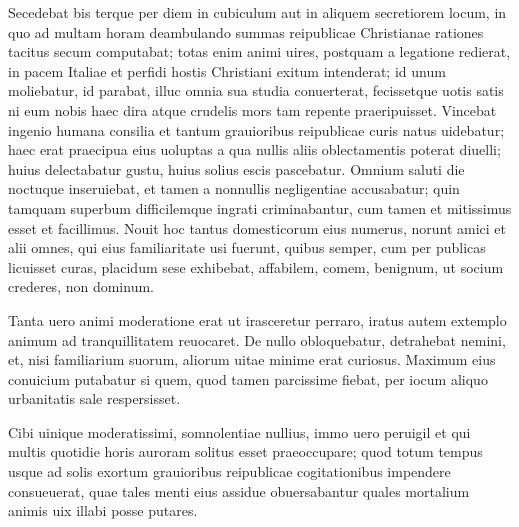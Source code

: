 \documentclass[a5paper,twoside]{article}
\begin{document}
Secedebat bis terque per diem in cubiculum aut in aliquem secretiorem locum, in quo ad multam horam deambulando summas reipublicae Christianae rationes tacitus secum computabat; totas enim animi uires, postquam a legatione redierat, in pacem Italiae et perfidi hostis Christiani exitum %
intenderat; id unum moliebatur, id parabat, illuc omnia sua studia conuerterat, fecissetque uotis satis ni eum nobis haec dira atque crudelis mors tam repente praeripuisset. Vincebat ingenio humana consilia et tantum grauioribus reipublicae curis natus uidebatur; haec erat praecipua eius uoluptas a qua nullis aliis oblectamentis poterat diuelli; huius delectabatur gustu, huius solius escis pascebatur. Omnium saluti die noctuque inseruiebat, et tamen a nonnullis negligentiae accusabatur; quin tamquam superbum difficilemque ingrati criminabantur, cum tamen et mitissimus esset et facillimus. Nouit hoc tantus domesticorum eius numerus, norunt amici et alii omnes, qui eius familiaritate usi fuerunt, quibus semper, cum per publicas licuisset curas, placidum sese exhibebat, affabilem, comem, benignum, ut socium crederes, non dominum.

Tanta uero animi moderatione erat ut irasceretur perraro, iratus autem extemplo animum ad tranquillitatem reuocaret. De nullo obloquebatur, detrahebat nemini, et, nisi familiarium suorum, aliorum uitae minime erat curiosus. Maximum eius conuicium putabatur si quem, quod tamen parcissime fiebat, per iocum aliquo urbanitatis sale respersisset.

Cibi uinique moderatissimi, somnolentiae nullius, immo uero peruigil et qui multis quotidie horis auroram solitus esset praeoccupare; quod totum tempus usque ad solis exortum grauioribus reipublicae cogitationibus impendere consueuerat, quae tales menti eius assidue obuersabantur quales mortalium animis uix illabi posse putares.



\endnumbering
\end{document}
